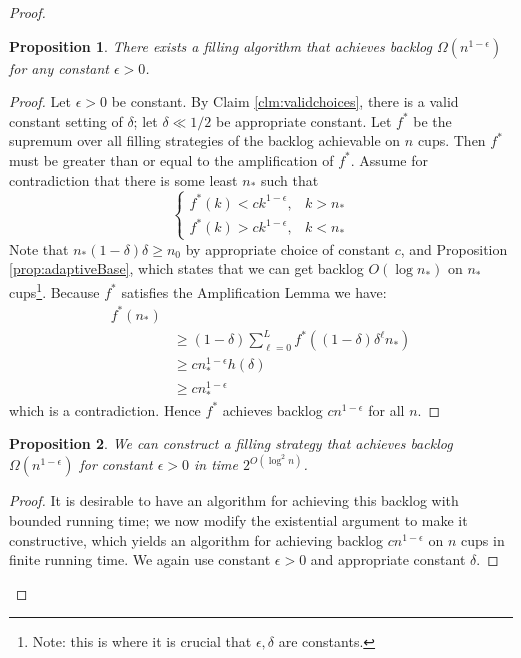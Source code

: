 \documentclass[twocolumn]{article}[10pt]
\newtheorem{proposition}{Proposition}
\begin{document}
\begin{proof}
  \begin{proposition}
    There exists a filling algorithm that achieves backlog
    $\Omega(n^{1-\epsilon})$ for any constant $\epsilon > 0$.
  \end{proposition}
  \begin{proof}
  Let $\epsilon > 0$ be constant. By Claim \ref{clm:validchoices}, there is a
  valid constant setting of $\delta$; let $\delta \ll 1/2$ be appropriate
  constant. Let $f^*$ be the supremum over all filling strategies of the
  backlog achievable on $n$ cups. Then $f^*$ must be greater than or equal to
  the amplification of $f^*$. Assume for contradiction that there is some least
  $n_*$ such that 
  $$\begin{cases}
    f^*(k)< ck^{1-\epsilon}, & k > n_*\\
    f^*(k)> ck^{1-\epsilon}, & k < n_*
  \end{cases} $$
  Note that $n_*(1-\delta)\delta \ge n_0$ by appropriate choice of constant
  $c$, and Proposition \ref{prop:adaptiveBase}, which states that we can get
  backlog $O(\log n_*)$ on $n_*$ cups\footnote{Note: this is where it is
  crucial that $\epsilon, \delta$ are constants.}.
  Because $f^*$ satisfies the Amplification Lemma we have:
\begin{align*}
  f^*(n_*) & \\
           &\ge (1-\delta)\sum_{\ell=0}^L f^*((1-\delta)\delta^\ell n_*) \\
           &\ge cn_*^{1-\epsilon} h(\delta)\\
           &\ge cn_*^{1-\epsilon}
\end{align*}
which is a contradiction. Hence $f^*$ achieves backlog $cn^{1-\epsilon}$ for all $n$.
    
  \end{proof}

  \begin{proposition}
    \label{prop:constructive_nepsil}
    We can construct a filling strategy that achieves backlog
    $\Omega(n^{1-\epsilon})$ for constant $\epsilon > 0$ in time $2^{O(\log^2 n)}$.
  \end{proposition}
  \begin{proof}
It is desirable to have an algorithm for achieving this backlog with bounded
running time; we now modify the existential argument to make it constructive, 
which yields an algorithm for achieving backlog $cn^{1-\epsilon}$ on $n$ cups 
in finite running time. We again use constant $\epsilon > 0$ and appropriate constant $\delta$.


\end{proof}
\end{proof}
\end{document}
